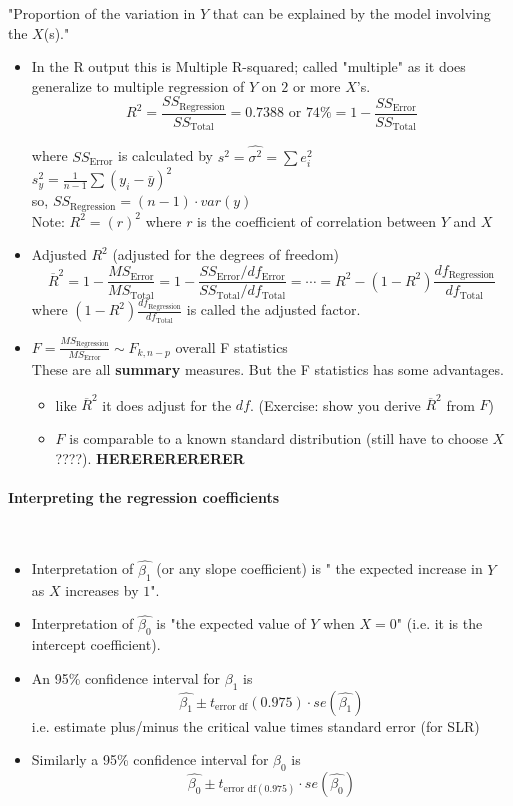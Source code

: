 \documentclass[a4paper, 11pt, twoside]{article}
\begin{document}
"Proportion of the variation in $Y$ that can be explained by the model involving the $X$(s)."

\begin{itemize}
	\item In the R output this is Multiple R-squared; called "multiple" as it does generalize to multiple regression of $Y$ on $2$ or more $X$'s.\\
	\[R^2=\frac{SS_{\text{Regression}}}{SS_{\text{Total}}}=0.7388 \text{ or } 74\% = 1 - \frac{SS_{\text{Error}}}{SS_{\text{Total}}}\]
	
	where $SS_{\text{Error}}$ is calculated by $s^2=\hat{\sigma^2}=\sum e_i^2$\\
	$s^2_y=\frac{1}{n-1}\sum (y_i-\bar{y})^2$\\
	so, $SS_{\text{Regression}}=(n-1)\cdot var(y)$\\
	Note: $R^2=(r)^2$ where $r$ is the coefficient of correlation between $Y$ and $X$
	\item Adjusted $R^2$ (adjusted for the degrees of freedom)
	\[\overline{R}^2=1-\frac{MS_{\text{Error}}}{MS_{\text{Total}}} = 1 - \frac{SS_{\text{Error}}/df_{\text{Error}}}{SS_{\text{Total}}/df_{\text{Total}}}=\cdots=R^2-(1-R^2)\frac{df_{\text{Regression}}}{df_{\text{Total}}}\]
	where $(1-R^2)\frac{df_{\text{Regression}}}{df_{\text{Total}}}$ is called the adjusted factor.
	\item $F=\frac{MS_{\text{Regression}}}{MS_{\text{Error}}}\sim F_{k,n-p}$ overall F statistics\\
	These are all \textbf{summary} measures. But the F statistics has some advantages.
	\begin{itemize}
		\item like $\overline{R}^2$ it does adjust for the $df$. (Exercise: show you derive $\overline{R}^2$ from $F$)
		\item $F$ is comparable to a known standard distribution (still have to choose $X$????). \textbf{HERERERERERER}
	\end{itemize}
\end{itemize}

\paragraph{Interpreting the regression coefficients}\ \\
\begin{itemize}
	\item Interpretation of $\hat{\beta_1}$ (or any slope coefficient) is " the expected increase in $Y$ as $X$ increases by $1$".
	\item Interpretation of $\hat{\beta_0}$ is "the expected value of $Y$ when $X=0$" (i.e. it is the intercept coefficient).
	\item An 95\% confidence interval for $\beta_1$ is
	\[\hat{\beta_1} \pm t_{\text{error df}}(0.975)\cdot se(\hat{\beta_1})\]
	i.e. estimate plus/minus the critical value times standard error (for SLR)
	\item Similarly a 95\% confidence interval for $\beta_0$ is
	\[\hat{\beta_0}\pm t_{\text{error df}(0.975)}\cdot se(\hat{\beta_0})\]
\end{itemize}
\end{document}
